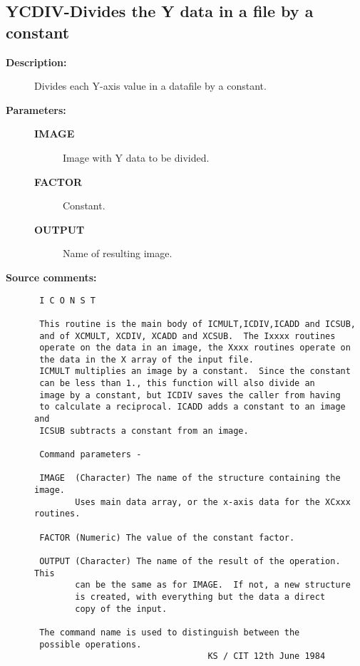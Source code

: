 \subsection{YCDIV-\label{YCDIV}Divides the Y data in a file by a constant}
\begin{description}

\item [{\bf Description:}]
 Divides each Y-axis value in a datafile by a constant.

\item [{\bf Parameters:}]
\begin{description}
\item [{\bf IMAGE}]
 Image with Y data to be divided.
\item [{\bf FACTOR}]
 Constant.
\item [{\bf OUTPUT}]
 Name of resulting image.
\end{description}

\item [{\bf Source comments:}]
\begin{verbatim}
 I C O N S T

 This routine is the main body of ICMULT,ICDIV,ICADD and ICSUB,
 and of XCMULT, XCDIV, XCADD and XCSUB.  The Ixxxx routines
 operate on the data in an image, the Xxxx routines operate on
 the data in the X array of the input file.
 ICMULT multiplies an image by a constant.  Since the constant
 can be less than 1., this function will also divide an
 image by a constant, but ICDIV saves the caller from having
 to calculate a reciprocal. ICADD adds a constant to an image and
 ICSUB subtracts a constant from an image.

 Command parameters -

 IMAGE  (Character) The name of the structure containing the image.
        Uses main data array, or the x-axis data for the XCxxx routines.

 FACTOR (Numeric) The value of the constant factor.

 OUTPUT (Character) The name of the result of the operation.  This
        can be the same as for IMAGE.  If not, a new structure
        is created, with everything but the data a direct
        copy of the input.

 The command name is used to distinguish between the
 possible operations.
                                  KS / CIT 12th June 1984
\end{verbatim}
\end{description}
